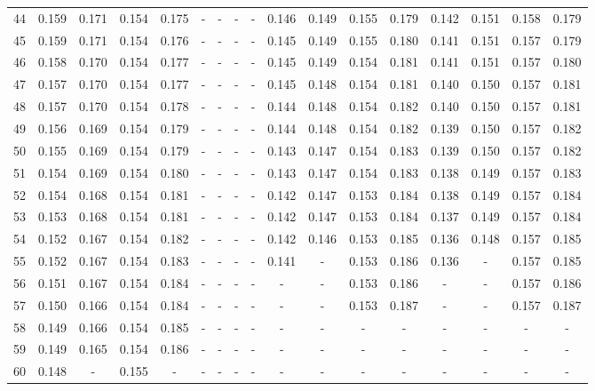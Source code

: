 \documentclass{report}
\begin{document}
\begin{appendices}
\begin{sidewaystable}
\begin{tabular}{|c|cccc|cccc|cccc|cccc|}
44 & 0.159 & 0.171 & 0.154 & 0.175 &   -   &   -   &   -   &   -   & 0.146 & 0.149 & 0.155 & 0.179 & 0.142 & 0.151 & 0.158 & 0.179\\
45 & 0.159 & 0.171 & 0.154 & 0.176 &   -   &   -   &   -   &   -   & 0.145 & 0.149 & 0.155 & 0.180 & 0.141 & 0.151 & 0.157 & 0.179\\
46 & 0.158 & 0.170 & 0.154 & 0.177 &   -   &   -   &   -   &   -   & 0.145 & 0.149 & 0.154 & 0.181 & 0.141 & 0.151 & 0.157 & 0.180\\
47 & 0.157 & 0.170 & 0.154 & 0.177 &   -   &   -   &   -   &   -   & 0.145 & 0.148 & 0.154 & 0.181 & 0.140 & 0.150 & 0.157 & 0.181\\
48 & 0.157 & 0.170 & 0.154 & 0.178 &   -   &   -   &   -   &   -   & 0.144 & 0.148 & 0.154 & 0.182 & 0.140 & 0.150 & 0.157 & 0.181\\
49 & 0.156 & 0.169 & 0.154 & 0.179 &   -   &   -   &   -   &   -   & 0.144 & 0.148 & 0.154 & 0.182 & 0.139 & 0.150 & 0.157 & 0.182\\
50 & 0.155 & 0.169 & 0.154 & 0.179 &   -   &   -   &   -   &   -   & 0.143 & 0.147 & 0.154 & 0.183 & 0.139 & 0.150 & 0.157 & 0.182\\
51 & 0.154 & 0.169 & 0.154 & 0.180 &   -   &   -   &   -   &   -   & 0.143 & 0.147 & 0.154 & 0.183 & 0.138 & 0.149 & 0.157 & 0.183\\
52 & 0.154 & 0.168 & 0.154 & 0.181 &   -   &   -   &   -   &   -   & 0.142 & 0.147 & 0.153 & 0.184 & 0.138 & 0.149 & 0.157 & 0.184\\
53 & 0.153 & 0.168 & 0.154 & 0.181 &   -   &   -   &   -   &   -   & 0.142 & 0.147 & 0.153 & 0.184 & 0.137 & 0.149 & 0.157 & 0.184\\
54 & 0.152 & 0.167 & 0.154 & 0.182 &   -   &   -   &   -   &   -   & 0.142 & 0.146 & 0.153 & 0.185 & 0.136 & 0.148 & 0.157 & 0.185\\
55 & 0.152 & 0.167 & 0.154 & 0.183 &   -   &   -   &   -   &   -   & 0.141 &   -   & 0.153 & 0.186 & 0.136 &   -   & 0.157 & 0.185\\
56 & 0.151 & 0.167 & 0.154 & 0.184 &   -   &   -   &   -   &   -   &   -   &   -   & 0.153 & 0.186 &   -   &   -   & 0.157 & 0.186\\
57 & 0.150 & 0.166 & 0.154 & 0.184 &   -   &   -   &   -   &   -   &   -   &   -   & 0.153 & 0.187 &   -   &   -   & 0.157 & 0.187\\
58 & 0.149 & 0.166 & 0.154 & 0.185 &   -   &   -   &   -   &   -   &   -   &   -   &   -   &   -   &   -   &   -   &   -   &   -  \\
59 & 0.149 & 0.165 & 0.154 & 0.186 &   -   &   -   &   -   &   -   &   -   &   -   &   -   &   -   &   -   &   -   &   -   &   -  \\
60 & 0.148 &   -   & 0.155 &   -   &   -   &   -   &   -   &   -   &   -   &   -   &   -   &   -   &   -   &   -   &   -   &   -  \\
\hline
\end{tabular}
\end{sidewaystable}


\end{appendices}
\end{document}
